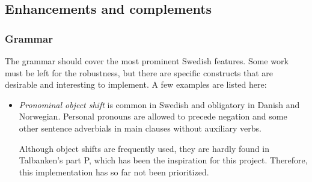 \documentclass{report}
\begin{document}
\subsection{Enhancements and complements}
\subsubsection{Grammar}
The grammar should cover the most prominent Swedish features.
Some work must be left for the robustness, but there are specific constructs
that are desirable and interesting to implement. A few examples are listed here:\\

\begin{itemize}
\item
\textit{Pronominal object shift} is common in Swedish and obligatory in Danish and Norwegian.
Personal pronouns are allowed to precede negation and some other sentence adverbials %
in main clauses without auxiliary verbs.


Although object shifts are frequently used, they are hardly found in
Talbanken's part P, which has been the inspiration for this project.
Therefore, this implementation has so far not been prioritized.\\




\end{itemize}
\end{document}
